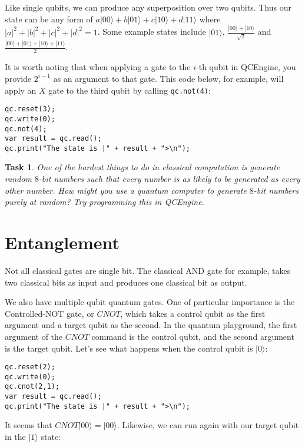 \documentclass[twocolumn]{article}
\newtheorem{task}{Task}[section]
\begin{document}
Like single qubits, we can produce any superposition over two qubits. Thus our state can be any form of $a|00\rangle + b|01\rangle + c|10\rangle + d|11\rangle$ where $|a|^2 + |b|^2 + |c|^2 + |d|^2 = 1$. Some example states include $|01\rangle$, $\frac{|00\rangle + |10\rangle}{\sqrt{2}}$ and $\frac{|00\rangle + |01\rangle + |10\rangle + |11\rangle}{2}$.

It is worth noting that when applying a gate to the $i$-th qubit in QCEngine, you provide $2^{i-1}$ as an argument to that gate. This code below, for example, will apply an $X$ gate to the third qubit by calling \texttt{qc.not(4)}:

\begin{lstlisting}
qc.reset(3);
qc.write(0);
qc.not(4);
var result = qc.read();
qc.print("The state is |" + result + ">\n");
\end{lstlisting}

\begin{task}
One of the hardest things to do in classical computation is generate random $8$-bit numbers such that every number is as likely to be generated as every other number. How might you use a quantum computer to generate $8$-bit numbers purely at random? Try programming this in QCEngine.
\end{task}

\section{Entanglement}
\label{sec:entanglement}

Not all classical gates are single bit. The classical AND gate for example, takes two classical bits as input and produces one classical bit as output.

We also have multiple qubit quantum gates. One of particular importance is the Controlled-NOT gate, or $CNOT$, which takes a control qubit as the first argument and a target qubit as the second. In the quantum playground, the first argument of the $CNOT$ command is the control qubit, and the second argument is the target qubit. Let's see what happens when the control qubit is $|0\rangle$:

\begin{lstlisting}
qc.reset(2);
qc.write(0);
qc.cnot(2,1);
var result = qc.read();
qc.print("The state is |" + result + ">\n");
\end{lstlisting}

It seems that $CNOT|00\rangle = |00\rangle$. Likewise, we can run again with our target qubit in the $|1\rangle$ state:
\end{document}
